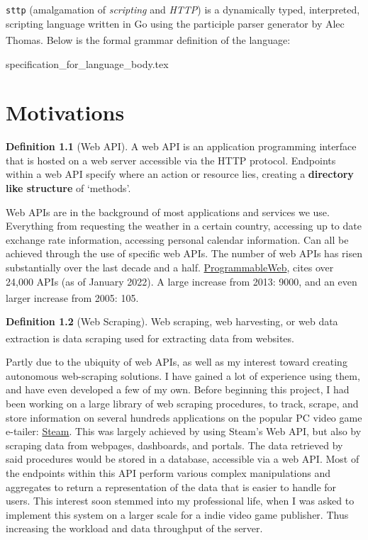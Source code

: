 \documentclass[]{full}
\theoremstyle{definition}
\newtheorem{definition}{Definition}[subsubsection]
\begin{document}
\verb|sttp| (amalgamation of \textit{scripting} and \textit{HTTP}) is a dynamically typed, interpreted, scripting language written in Go using the participle parser generator by Alec Thomas\textsuperscript{\cite{thomas_2021}}. Below is the formal grammar definition of the language:

{specification_for_language_body.tex}

\chapter{Motivations}
\label{chap:motivations}

\begin{definition}[Web API]
    A web API is an application programming interface that is hosted on a web server accessible via the HTTP protocol. Endpoints within a web API specify where an action or resource lies, creating a \textbf{directory like structure} of `methods'.
\end{definition}

Web APIs are in the background of most applications and services we use. Everything from requesting the weather in a certain country, accessing up to date exchange rate information, accessing personal calendar information. Can all be achieved through the use of specific web APIs. The number of web APIs has risen substantially over the last decade and a half. \href{https://www.programmableweb.com/category/all/apis}{ProgrammableWeb}, cites over 24,000 APIs (as of January 2022). A large increase from 2013: 9000, and an even larger increase from 2005: 105\textsuperscript{\cite{duvander_2013}}.

\begin{definition}[Web Scraping]
    Web scraping, web harvesting, or web data extraction is data scraping used for extracting data from websites\textsuperscript{\cite{web_scraping_wikipedia_2022}}.
\end{definition}

Partly due to the ubiquity of web APIs, as well as my interest toward creating autonomous web-scraping solutions. I have gained a lot of experience using them, and have even developed a few of my own. Before beginning this project, I had been working on a large library of web scraping procedures, to track, scrape, and store information on several hundreds applications on the popular PC video game e-tailer: \href{https://store.steampowered.com/}{Steam}. This was largely achieved by using Steam's Web API, but also by scraping data from webpages, dashboards, and portals. The data retrieved by said procedures would be stored in a database, accessible via a web API. Most of the endpoints within this API perform various complex manipulations and aggregates to return a representation of the data that is easier to handle for users. This interest soon stemmed into my professional life, when I was asked to implement this system on a larger scale for a indie video game publisher. Thus increasing the workload and data throughput of the server.
\end{document}
